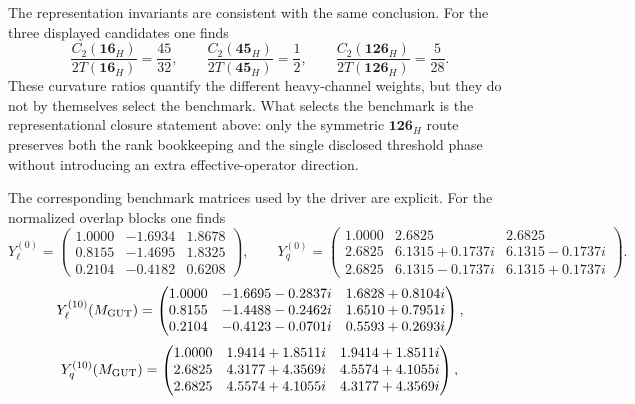 \documentclass[11pt]{article}
\begin{document}
The representation invariants are consistent with the same conclusion. For the three displayed candidates one finds
\begin{equation}
 \frac{C_2(\mathbf{16}_H)}{2T(\mathbf{16}_H)}=\frac{45}{32},
 \qquad
 \frac{C_2(\mathbf{45}_H)}{2T(\mathbf{45}_H)}=\frac{1}{2},
 \qquad
 \frac{C_2(\mathbf{126}_H)}{2T(\mathbf{126}_H)}=\frac{5}{28}.
\end{equation}
These curvature ratios quantify the different heavy-channel weights, but they do not by themselves select the benchmark. What selects the benchmark is the representational closure statement above: only the symmetric $\mathbf{126}_H$ route preserves both the rank bookkeeping and the single disclosed threshold phase without introducing an extra effective-operator direction.

The corresponding benchmark matrices used by the driver are explicit. For the normalized overlap blocks one finds
\begingroup
\setlength{\arraycolsep}{4pt}
\small
\begin{equation}
 Y_{\ell}^{(0)}=
 \begin{pmatrix}
  1.0000 & -1.6934 & 1.8678 \\
  0.8155 & -1.4695 & 1.8325 \\
  0.2104 & -0.4182 & 0.6208
 \end{pmatrix},
 \qquad
 Y_q^{(0)}=
 \begin{pmatrix}
  1.0000 & 2.6825 & 2.6825 \\
  2.6825 & 6.1315+0.1737i & 6.1315-0.1737i \\
  2.6825 & 6.1315-0.1737i & 6.1315+0.1737i
 \end{pmatrix}.
\end{equation}
\begin{equation}
 Y_{\ell}^{(10)}(M_{\rm GUT})=
 \begin{pmatrix}
  1.0000 & -1.6695-0.2837i & 1.6828+0.8104i \\
  0.8155 & -1.4488-0.2462i & 1.6510+0.7951i \\
  0.2104 & -0.4123-0.0701i & 0.5593+0.2693i
 \end{pmatrix},
\end{equation}
\begin{equation}
 Y_q^{(10)}(M_{\rm GUT})=
 \begin{pmatrix}
  1.0000 & 1.9414+1.8511i & 1.9414+1.8511i \\
  2.6825 & 4.3177+4.3569i & 4.5574+4.1055i \\
  2.6825 & 4.5574+4.1055i & 4.3177+4.3569i
 \end{pmatrix},
\end{equation}
\end{document}
